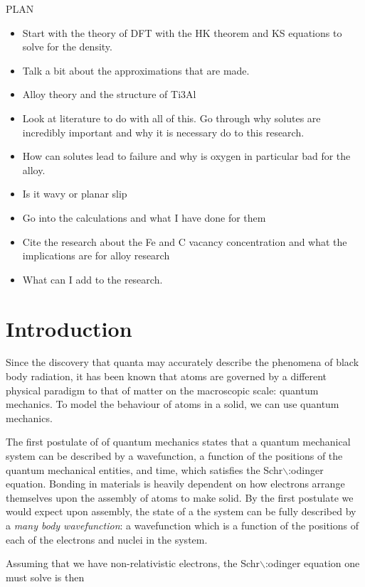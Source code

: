 \documentclass[11pt]{article}
\date{\today}
\title{}
\begin{document}
\tableofcontents

PLAN 

\begin{itemize}
\item Start with the theory of DFT with the HK theorem and KS equations to solve
for the density.
\item Talk a bit about the approximations that are made.
\item Alloy theory and the structure of Ti3Al
\item Look at literature to do with all of this. Go through why solutes are
incredibly important and why it is necessary do to this research.
\item How can solutes lead to failure and why is oxygen in particular bad for the alloy.
\item Is it wavy or planar slip
\item Go into the calculations and what I have done for them
\item Cite the research about the Fe and C vacancy concentration and what the
implications are for alloy research
\item What can I add to the research.
\end{itemize}

\section{Introduction}
\label{sec:org07bfc2c}

Since the discovery that quanta may accurately describe the phenomena of black body radiation,
it has been known that atoms are governed by a different physical paradigm to that of matter on
the macroscopic scale: quantum mechanics. To model the behaviour of atoms in a solid, we can
use quantum mechanics.

The first postulate of of quantum mechanics states that a quantum mechanical system can be
described by a wavefunction, a function of the positions of the quantum mechanical entities,
and time, which satisfies the Schr$\backslash$:odinger equation. Bonding in materials is heavily dependent
on how electrons arrange themselves upon the assembly of atoms to make solid. By the first postulate we
would expect upon assembly, the state of a the system can be fully described by a \emph{many body
wavefunction}: a wavefunction which is a function of the positions of each of the electrons and
nuclei in the system.

Assuming that we have non-relativistic electrons, the Schr$\backslash$:odinger equation one must solve is then 
\end{document}
